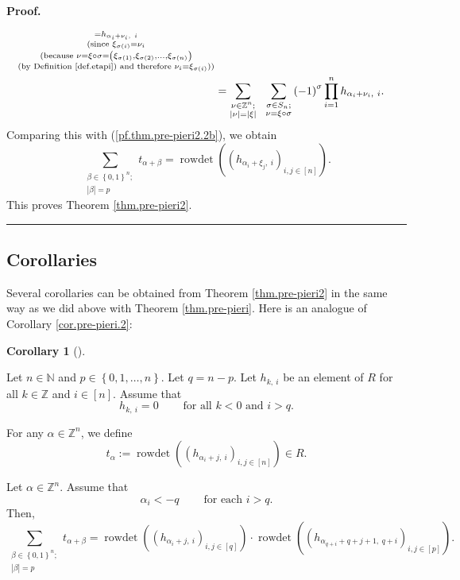 \documentclass
[numbers=enddot,12pt,final,onecolumn,notitlepage,english]{scrartcl}%
\theoremstyle{definition}
\newtheorem{coro}[theo]{Corollary}
\newenvironment{corollary}[1][]
{\begin{coro}[#1]\begin{leftbar}}
{\end{leftbar}\end{coro}}
\newenvironment{proof}[1][Proof]{\noindent\textbf{#1.} }{\ \rule{0.5em}{0.5em}}
\let\sumnonlimits\sum
\let\prodnonlimits\prod
\renewcommand{\sum}{\sumnonlimits\limits}
\renewcommand{\prod}{\prodnonlimits\limits}
\newenvironment{verlong}{}{}
\begin{document}
\begin{verlong}
\begin{proof}
\begin{align*}
_{\substack{=h_{\alpha_{i}+\nu_{i},\ i}\\\text{(since }\xi_{\sigma\left(
i\right)  }=\nu_{i}\\\text{(because }\nu=\xi\circ\sigma=\left(  \xi
_{\sigma\left(  1\right)  },\xi_{\sigma\left(  2\right)  },\ldots,\xi
_{\sigma\left(  n\right)  }\right)  \\\text{(by Definition \ref{def.etapi})
and therefore }\nu_{i}=\xi_{\sigma\left(  i\right)  }\text{))}}}\\
&  =\sum_{\substack{\nu\in\mathbb{Z}^{n};\\\left\vert \nu\right\vert
=\left\vert \xi\right\vert }}\ \ \sum_{\substack{\sigma\in S_{n};\\\nu
=\xi\circ\sigma}}\left(  -1\right)  ^{\sigma}\prod_{i=1}^{n}h_{\alpha_{i}%
+\nu_{i},\ i}.
\end{align*}
Comparing this with (\ref{pf.thm.pre-pieri2.2b}), we obtain%
\[
\sum_{\substack{\beta\in\left\{  0,1\right\}  ^{n};\\\left\vert \beta
\right\vert =p}}t_{\alpha+\beta}=\operatorname*{rowdet}\left(  \left(
h_{\alpha_{i}+\xi_{j},\ i}\right)  _{i,j\in\left[  n\right]  }\right)  .
\]
This proves Theorem \ref{thm.pre-pieri2}.
\end{proof}
\end{verlong}

\subsection{Corollaries}

Several corollaries can be obtained from Theorem \ref{thm.pre-pieri2} in the
same way as we did above with Theorem \ref{thm.pre-pieri}. Here is an analogue
of Corollary \ref{cor.pre-pieri.2}:

\begin{corollary}
\label{cor.pre-pieri2.2}Let $n\in\mathbb{N}$ and $p\in\left\{  0,1,\ldots
,n\right\}  $. Let $q=n-p$. Let $h_{k,\ i}$ be an element of $R$ for all
$k\in\mathbb{Z}$ and $i\in\left[  n\right]  $. Assume that%
\begin{equation}
h_{k,\ i}=0\ \ \ \ \ \ \ \ \ \ \text{for all }k<0\text{ and }i>q.
\label{eq.cor.pre-pieri2.2.ass}%
\end{equation}


For any $\alpha\in\mathbb{Z}^{n}$, we define%
\[
t_{\alpha}:=\operatorname*{rowdet}\left(  \left(  h_{\alpha_{i}+j,\ i}\right)
_{i,j\in\left[  n\right]  }\right)  \in R.
\]


Let $\alpha\in\mathbb{Z}^{n}$. Assume that%
\begin{equation}
\alpha_{i}<-q\ \ \ \ \ \ \ \ \ \ \text{for each }i>q.
\label{eq.cor.pre-pieri2.2.ass-minus}%
\end{equation}
Then,%
\[
\sum_{\substack{\beta\in\left\{  0,1\right\}  ^{n};\\\left\vert \beta
\right\vert =p}}t_{\alpha+\beta}=\operatorname*{rowdet}\left(  \left(
h_{\alpha_{i}+j,\ i}\right)  _{i,j\in\left[  q\right]  }\right)
\cdot\operatorname*{rowdet}\left(  \left(  h_{\alpha_{q+i}+q+j+1,\ q+i}%
\right)  _{i,j\in\left[  p\right]  }\right)  .
\]

\end{corollary}
\end{document}
